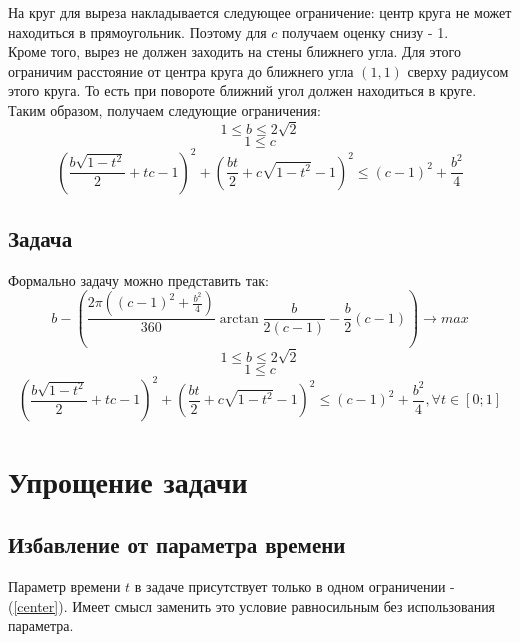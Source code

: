 На круг для выреза накладывается следующее ограничение: центр круга не может находиться в прямоугольник. Поэтому для $c$ получаем оценку снизу - 1. \\

Кроме того, вырез не должен заходить на стены ближнего угла. Для этого ограничим расстояние от центра круга до ближнего угла $(1,1)$ сверху радиусом этого круга. То есть при повороте ближний угол должен находиться в круге. \\

Таким образом, получаем следующие ограничения:
\begin{equation}
1 \leq b \leq 2\sqrt{2}
\end{equation}
\begin{equation}
1 \leq c
\end{equation}
\begin{equation}
( \frac{b\sqrt{1-t^2}}{2}+tc - 1)^2 + (\frac{bt}{2}+c\sqrt{1-t^2}-1)^2 \leq (c-1)^2+\frac{b^2}{4}
\end{equation}

\subsection{Задача}
Формально задачу можно представить так:
\begin{equation}
b-(\frac{2\pi ((c-1)^2+\frac{b^2}{4})}{360} \arctan{\frac{b}{2(c-1)}} - \frac{b}{2}(c-1)) \rightarrow max
\end{equation}
\begin{equation}
1 \leq b \leq 2\sqrt{2}
\end{equation}
\begin{equation}
1 \leq c
\end{equation}
\begin{equation} \label{center}
( \frac{b\sqrt{1-t^2}}{2}+tc - 1)^2 + (\frac{bt}{2}+c\sqrt{1-t^2}-1)^2 \leq (c-1)^2+\frac{b^2}{4}, \forall t \in [0;1]
\end{equation}



\section{Упрощение задачи}
\subsection{Избавление от параметра времени}
Параметр времени $t$ в задаче присутствует только в одном ограничении - (\ref{center}). Имеет смысл заменить это условие равносильным без использования параметра. \\

